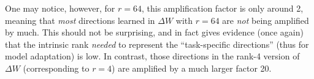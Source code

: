 \documentclass{article} %
\begin{document}
One may notice, however, for $r=64$, this amplification factor is only around 2, meaning that \emph{most} directions learned in $\Delta W$ with $r=64$ are \emph{not} being amplified by much.
This should not be surprising, and in fact gives evidence (once again) that the intrinsic rank \emph{needed} to represent the ``task-specific directions'' (thus for model adaptation) is low.
In contrast, those directions in the rank-4 version of $\Delta W$ (corresponding to $r=4$) are amplified by a much larger factor 20.
\end{document}
